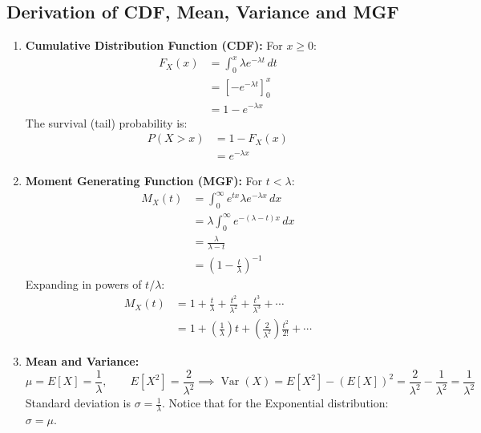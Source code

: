 \documentclass[12pt,a4paper]{article}
\begin{document}
\subsection{Derivation of CDF, Mean, Variance and MGF}
\begin{enumerate}[leftmargin=*, itemsep=3pt]
  \item \textbf{Cumulative Distribution Function (CDF):} For $x \ge 0$:
  \begin{equation}
    \begin{aligned}
      F_X(x) &= \int_0^x \lambda e^{-\lambda t} \, dt \\[3pt]
      &= \left[-e^{-\lambda t}\right]_0^x \\[3pt]
      &= 1 - e^{-\lambda x}
    \end{aligned}
  \end{equation}
  The survival (tail) probability is:
  \begin{equation}
    \begin{aligned}
      P(X > x) &= 1 - F_X(x) \\[3pt]
      &= e^{-\lambda x}
    \end{aligned}
  \end{equation}
  \item \textbf{Moment Generating Function (MGF):} For $t < \lambda$:
  \begin{equation}
    \begin{aligned}
      M_X(t) &= \int_0^\infty e^{tx} \lambda e^{-\lambda x} \, dx \\[3pt]
      &= \lambda \int_0^\infty e^{-(\lambda - t)x} \, dx \\[3pt]
      &= \frac{\lambda}{\lambda - t} \\[3pt]
      &= \left(1 - \frac{t}{\lambda}\right)^{-1}
    \end{aligned}
  \end{equation}
  Expanding in powers of $t/\lambda$:
  \begin{equation}
    \begin{aligned}
      M_X(t) &= 1 + \frac{t}{\lambda} + \frac{t^2}{\lambda^2} + \frac{t^3}{\lambda^3} + \cdots \\[3pt]
      &= 1 + \left(\frac{1}{\lambda}\right) t + \left(\frac{2}{\lambda^2}\right) \frac{t^2}{2!} + \cdots
    \end{aligned}
  \end{equation}
  \item \textbf{Mean and Variance:}
  \begin{equation}
    \mu = E[X] = \frac{1}{\lambda}, \qquad E[X^2] = \frac{2}{\lambda^2} \implies \operatorname{Var}(X) = E[X^2] - (E[X])^2 = \frac{2}{\lambda^2} - \frac{1}{\lambda^2} = \frac{1}{\lambda^2}
  \end{equation}
  Standard deviation is $\sigma = \frac{1}{\lambda}$. Notice that for the Exponential distribution: $\sigma = \mu$.
\end{enumerate}
\end{document}
